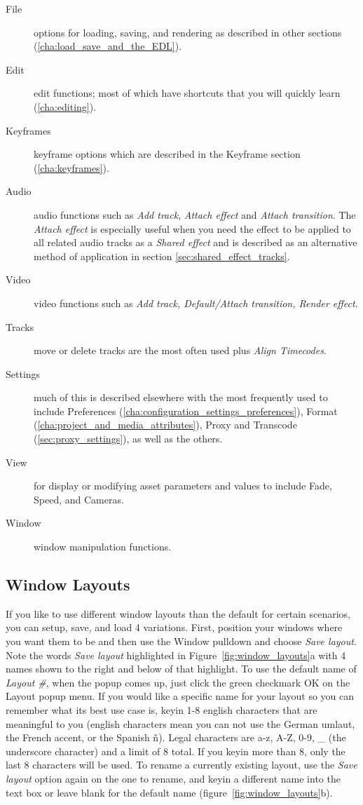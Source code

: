 \begin{description}
    \item[File]  options for loading, saving, and rendering as described in other sections (\ref{cha:load_save_and_the_EDL}).
    \item[Edit]  edit functions; most of which have shortcuts that you will quickly learn (\ref{cha:editing}).
    \item[Keyframes]  keyframe options which are described in the Keyframe section (\ref{cha:keyframes}).
    \item[Audio]  audio functions such as \textit{Add track}, \textit{Attach effect}
and \textit{Attach transition}.  The \textit{Attach effect} is especially useful when
you need the effect to be applied to all related audio tracks as a \textit{Shared effect}
and is described as an alternative method of application in section \ref{sec:shared_effect_tracks}.
    \item[Video]  video functions such as \textit{Add track, Default/Attach transition, Render effect}.
    \item[Tracks]  move or delete tracks are the most often used plus \textit{Align Timecodes}.
    \item[Settings]  much of this is described elsewhere with the most frequently used to include
Preferences (\ref{cha:configuration_settings_preferences}), Format (\ref{cha:project_and_media_attributes}), 
Proxy and Transcode (\ref{sec:proxy_settings}), as well as the others.
    \item[View]  for display or modifying asset parameters and values to include Fade, Speed, and Cameras.
    \item[Window]  window manipulation functions.
\end{description}


\subsection{Window Layouts}%
\label{sub:window_layouts}

If you like to use different window layouts than the default for certain scenarios, you can setup, save, and load 4 variations.   
First, position your \CGG{} windows where you want them to be and then use the Window pulldown and choose \emph{Save layout}. Note the words \emph{Save layout} highlighted in Figure~\ref{fig:window_layouts}a with 4 names shown to the right and below of that highlight. 
To use the default name of \textit{Layout \#}, when the popup comes up, just click the green checkmark OK on the Layout popup menu.  
If you would like a specific name for your layout so you can remember what its best use case is,
keyin 1-8 english characters that are meaningful to you (english characters mean you can not use the German umlaut, the French accent, or the Spanish ñ). 
Legal characters are a-z, A-Z, 0-9, \_ (the underscore character) and a limit of 8 total.  
If you keyin more than 8, only the last 8 characters will be used.  
To rename a currently existing layout, use the \emph{Save layout} option again on the one to rename, and keyin a different name into the text box or leave blank for the default name (figure~\ref{fig:window_layouts}b).

